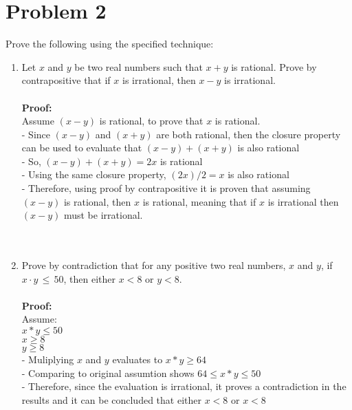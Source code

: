 \documentclass{amsart}
\theoremstyle{definition}
\theoremstyle{Exercise}
\theoremstyle{remark}
\theoremstyle{rule}
\numberwithin{equation}{section}
\begin{document}
  \section*{Problem 2}
  Prove the following using the specified technique:
  \begin{enumerate}[label=(\alph*)]
    \item Let $x$ and $y$ be two real numbers such that $x + y$ is rational. Prove by contrapositive that if $x$ is irrational, then $x - y$ is irrational.
          \\\\
  \textbf{Proof:}\\
  Assume $(x-y)$ is rational, to prove that $x$ is rational.\\
  - Since $(x-y)$ and $(x+y)$ are both rational, then the closure property can be used to evaluate that $(x-y)+(x+y)$ is also rational\\
  - So, $(x-y)+(x+y) = 2x$ is rational\\
  - Using the same closure property, $(2x)/2 = x$ is also rational\\
  - Therefore, using proof by contrapositive it is proven that assuming $(x-y)$ is rational, then $x$ is rational, meaning that if $x$ is irrational 
    then $(x-y)$ must be irrational.\\  
\\\\
    \item Prove by contradiction that for any positive two real numbers, $x$ and $y$,
         if $x\cdot y\, \leq \,50$, then either $x < 8$ or $y < 8$.
          \\\\
  \textbf{Proof:}\\
  Assume: \\
  \indent $x*y \leq 50$\\
  \indent $x \geq 8$\\
  \indent $y \geq 8$\\
  - Muliplying $x$ and $y$ evaluates to $x*y \geq 64$\\
  - Comparing to original assumtion shows $64 \leq x*y \leq 50$\\
  - Therefore, since the evaluation is irrational, it proves a contradiction in the results and it can be concluded that either $x < 8$ or $x < 8$\\
\\\\
  \end{enumerate}
  \newpage
\end{document}
